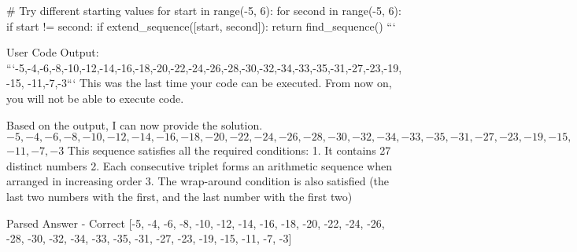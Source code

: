 \begin{claudels}{\claudeheader}
# Try different starting values     
for start in range(-5, 6):         
    for second in range(-5, 6):             
        if start != second:                 
            if extend_sequence([start, second]):                     
                return  find_sequence() ```
\end{claudels}
\endgroup

\begin{prompt}{User}
Code Output: 
```-5,-4,-6,-8,-10,-12,-14,-16,-18,-20,-22,-24,-26,-28,-30,-32,-34,-33,-35,-31,-27,-23,-19,-15,
-11,-7,-3```
This was the last time your code can be executed. From now on, you will not be able to execute code.
\end{prompt}

\begingroup\raggedleft
\begin{claudels}{\claudeheader}
Based on the output, I can now provide the solution.
$\boxed{-5,-4,-6,-8,-10,-12,-14,-16,-18,-20,-22,-24,-26,-28,-30,-32,-34,-33,-35,-31,-27,-23,-19,-15,}$
$\boxed{-11,-7,-3}$
This sequence satisfies all the required conditions:
    1. It contains 27 distinct numbers
    2. Each consecutive triplet forms an arithmetic sequence when arranged in increasing order
    3. The wrap-around condition is also satisfied (the last two numbers with the first, and the last number with the first two)
\end{claudels}
\endgroup

\begin{parsecheckcorrect}{Parsed Answer - Correct}
[-5, -4, -6, -8, -10, -12, -14, -16, -18, -20, -22, -24, -26, -28, -30, -32, -34, -33, -35, -31, -27, -23, -19, -15, -11, -7, -3]
\end{parsecheckcorrect}

